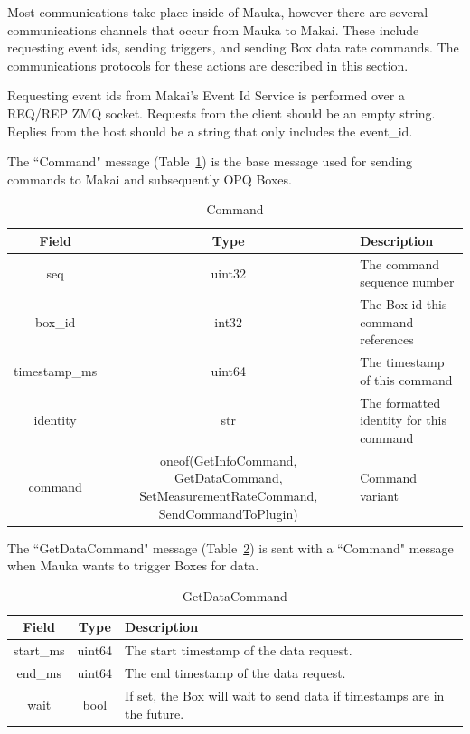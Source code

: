 Most communications take place inside of Mauka, however there are several communications channels that occur from Mauka to Makai. These include requesting event ids, sending triggers, and sending Box data rate commands. The communications protocols for these actions are described in this section.

Requesting event ids from Makai's Event Id Service is performed over a REQ/REP ZMQ socket. Requests from the client should be an empty string. Replies from the host should be a string that only includes the event\_id.

The ``Command" message (Table~\ref{table:Command}) is the base message used for sending commands to Makai and subsequently OPQ Boxes.

\begin{table}[H]
	\centering
	\caption{Command}
	\begin{tabular}{|c|c|p{8cm}|}
		\hline
		Field & Type & Description  \\
		\hline
		seq & uint32 & The command sequence number \\
		\hline
		box\_id & int32 & The Box id this command references \\
		\hline
		timestamp\_ms & uint64 & The timestamp of this command \\
		\hline
		identity & str & The formatted identity for this command \\
		\hline
		command & oneof(GetInfoCommand, GetDataCommand, SetMeasurementRateCommand, SendCommandToPlugin) & Command variant \\
		\hline
	\end{tabular}
	\label{table:Command}
\end{table}

The ``GetDataCommand" message (Table~\ref{table:GetDataCommand}) is sent with a ``Command" message when Mauka wants to trigger Boxes for data.

\begin{table}[H]
	\centering
	\caption{GetDataCommand}
	\begin{tabular}{|c|c|p{8cm}|}
		\hline
		Field & Type & Description  \\
		\hline
		start\_ms & uint64 & The start timestamp of the data request. \\
		\hline
		end\_ms & uint64 & The end timestamp of the data request. \\
		\hline
		wait & bool & If set, the Box will wait to send data if timestamps are in the future. \\
		\hline
	\end{tabular}
	\label{table:GetDataCommand}
\end{table}

